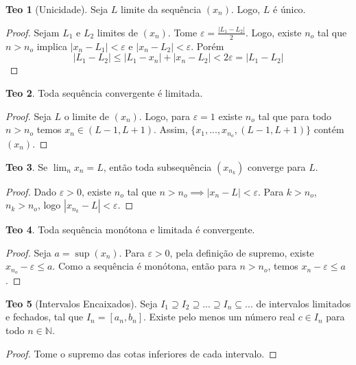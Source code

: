 \documentclass[journal, letterpaper]{IEEEtran}
\theoremstyle{definition}
\newtheorem{theorem}{Teo}
\begin{document}
\begin{theorem}[Unicidade]
	Seja $L$ limite da sequência $(x_n)$. Logo, $L$ é único.
\end{theorem}
\begin{proof}
	Sejam $L_1$ e $L_2$ limites de $(x_n)$. Tome $\varepsilon = \frac{|L_1-L_2|}{2}$.
	Logo, existe $n_o$ tal que $n>n_o$ implica $|x_n - L_1|<\varepsilon$ e
	$|x_n - L_2|<\varepsilon$. Porém
	\begin{equation}
		|L_1-L_2|\leq |L_1 - x_n| + |x_n - L_2| < 2\varepsilon = |L_1 - L_2|
	\end{equation}
\end{proof}
\begin{theorem}
	Toda sequência convergente é limitada.	
\end{theorem}
\begin{proof}
	Seja $L$ o limite de $(x_n)$. Logo, para $\varepsilon = 1$ existe
	$n_o$ tal que para todo $n > n_o$ temos $x_n \in (L-1,L+1)$.
	Assim, $\{x_1,...,x_{n_o},(L-1,L+1)\}$ contém $(x_n)$.
\end{proof}
\begin{theorem}
	Se $\lim_n x_n = L$, então toda subsequência $(x_{n_k})$ converge para $L$.
\end{theorem}
\begin{proof}
	Dado $\varepsilon > 0$, existe $n_o$ tal que $n>n_o \implies
	|x_n - L| < \varepsilon$. Para $k>n_o$, $n_k > n_o$, logo
	$|x_{n_k} - L| < \varepsilon$.
\end{proof}

\begin{theorem}
	Toda sequência monótona e limitada é convergente.
\end{theorem}
\begin{proof}
	Seja $a = \sup (x_n)$. Para $\varepsilon > 0$, pela definição de supremo,
	existe $x_{n_o} - \varepsilon \leq a$. Como a sequência é monótona, então
	para $n>n_o$, temos $x_n - \varepsilon \leq a$.
\end{proof}
\begin{theorem}[Intervalos Encaixados]
	Seja $I_1 \supseteq I_2 \supseteq ... \supseteq I_n \subseteq ...$ de intervalos limitados e fechados,
	tal que $I_n = [a_n,b_n]$. Existe pelo menos um número real $c \in I_n$ para todo $n \in \mathbb N$.
\end{theorem}
\begin{proof}
	Tome o supremo das cotas inferiores de cada intervalo. 
\end{proof}
\end{document}
